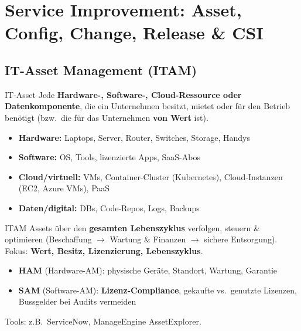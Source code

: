 \documentclass[a4paper, fontsize=7pt]{scrartcl}
\begin{document}
\section{Service Improvement: Asset, Config, Change, Release \& CSI}

\subsection{IT-Asset Management (ITAM)}

\begin{mainbox}{IT-Asset}
Jede \textbf{Hardware-, Software-, Cloud-Ressource oder Datenkomponente}, die ein
Unternehmen besitzt, mietet oder für den Betrieb benötigt (bzw.\ die für das
Unternehmen \textbf{von Wert} ist).
\begin{itemize}
    \item \textbf{Hardware:} Laptops, Server, Router, Switches, Storage, Handys
    \item \textbf{Software:} OS, Tools, lizenzierte Apps, SaaS-Abos
    \item \textbf{Cloud/virtuell:} VMs, Container-Cluster (Kubernetes),
          Cloud-Instanzen (EC2, Azure VMs), PaaS
    \item \textbf{Daten/digital:} DBs, Code-Repos, Logs, Backups
\end{itemize}
\end{mainbox}

\begin{mainbox}{ITAM}
Assets über den \textbf{gesamten Lebenszyklus} verfolgen, steuern \&
optimieren (Beschaffung $\to$ Wartung \& Finanzen $\to$ sichere Entsorgung).
Fokus: \textbf{Wert, Besitz, Lizenzierung, Lebenszyklus}.
\begin{itemize}
    \item \textbf{HAM} (Hardware-AM): physische Geräte, Standort, Wartung,
          Garantie
    \item \textbf{SAM} (Software-AM): \textbf{Lizenz-Compliance}, gekaufte
          vs.\ genutzte Lizenzen, Bussgelder bei Audits vermeiden
\end{itemize}
Tools: z.B.\ ServiceNow, ManageEngine AssetExplorer.
\end{mainbox}
\end{document}
